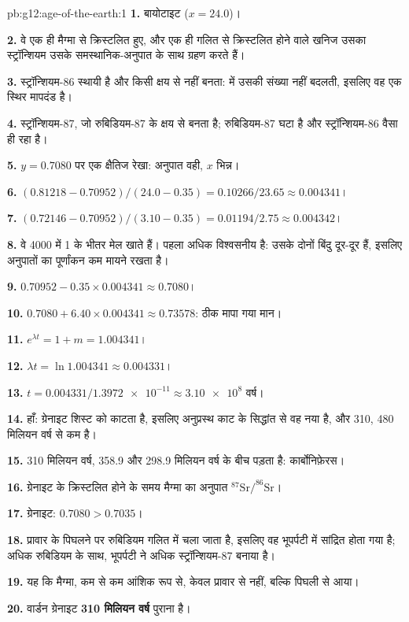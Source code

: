 \begin{solution}{pb:g12:age-of-the-earth:1}
\textbf{1.} बायोटाइट ($x = 24.0$)।

\textbf{2.} वे एक ही मैग्मा से क्रिस्टलित हुए, और एक ही गलित से क्रिस्टलित होने वाले
खनिज उसका स्ट्रॉन्शियम उसके समस्थानिक-अनुपात के साथ ग्रहण करते हैं।

\textbf{3.} स्ट्रॉन्शियम-86 स्थायी है और किसी क्षय से नहीं बनता:  में
उसकी संख्या नहीं बदलती, इसलिए वह एक स्थिर मापदंड है।

\textbf{4.} स्ट्रॉन्शियम-87, जो रुबिडियम-87 के क्षय से बनता है; रुबिडियम-87
घटा है और स्ट्रॉन्शियम-86 वैसा ही रहा है।

\textbf{5.} $y = 0.7080$ पर एक क्षैतिज रेखा: अनुपात वही, $x$ भिन्न।

\textbf{6.} $(0.81218 - 0.70952)/(24.0 - 0.35) = 0.10266/23.65 \approx
0.004341$।

\textbf{7.} $(0.72146 - 0.70952)/(3.10 - 0.35) = 0.01194/2.75 \approx
0.004342$।

\textbf{8.} वे 4000 में 1 के भीतर मेल खाते हैं। पहला अधिक विश्वसनीय है:
उसके दोनों बिंदु दूर-दूर हैं, इसलिए अनुपातों का पूर्णांकन कम मायने रखता है।

\textbf{9.} $0.70952 - 0.35 \times 0.004341 \approx 0.7080$।

\textbf{10.} $0.7080 + 6.40 \times 0.004341 \approx 0.73578$: ठीक
मापा गया मान।

\textbf{11.} $e^{\lambda t} = 1 + m = 1.004341$।

\textbf{12.} $\lambda t = \ln 1.004341 \approx 0.004331$।

\textbf{13.} $t = 0.004331/\num{1.3972e-11} \approx \num{3.10e8}$ वर्ष।

\textbf{14.} हाँ: ग्रेनाइट शिस्ट को काटता है, इसलिए अनुप्रस्थ काट के
सिद्धांत से वह नया है, और 310, 480 मिलियन
वर्ष से कम है।

\textbf{15.} 310 मिलियन वर्ष, 358.9 और 298.9 मिलियन वर्ष के बीच पड़ता है:
कार्बोनिफ़ेरस।

\textbf{16.} ग्रेनाइट के क्रिस्टलित होने के समय मैग्मा का अनुपात
$^{87}\mathrm{Sr}/^{86}\mathrm{Sr}$।

\textbf{17.} ग्रेनाइट: $0.7080 > 0.7035$।

\textbf{18.} प्रावार के पिघलने पर रुबिडियम गलित में चला जाता है, इसलिए वह
भूपर्पटी में सांद्रित होता गया है; अधिक रुबिडियम के साथ, भूपर्पटी ने अधिक
स्ट्रॉन्शियम-87 बनाया है।

\textbf{19.} यह कि मैग्मा, कम से कम आंशिक रूप से, केवल प्रावार से नहीं, बल्कि पिघली
 से आया।

\textbf{20.} वार्डन ग्रेनाइट \textbf{310 मिलियन वर्ष} पुराना है।
\end{solution}

